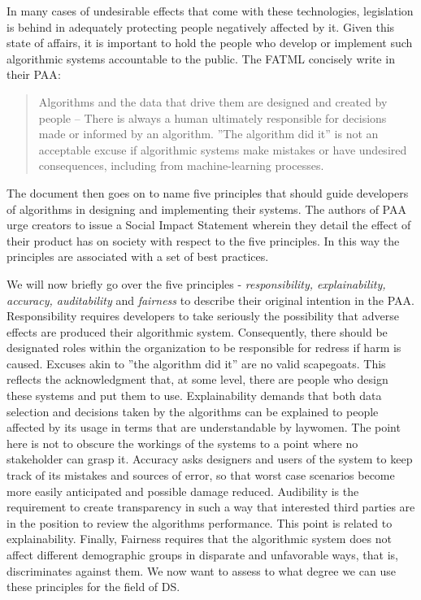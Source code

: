\documentclass{article}
\begin{document}
\newpage In many cases of undesirable effects that come with these technologies, legislation is behind in adequately protecting people negatively affected by it.
Given this state of affairs, it is important to hold the people who develop or implement such algorithmic systems accountable to the public. The FATML concisely write in their PAA\cite{principles}: 
\begin{quote}
Algorithms and the data that drive them are designed and created by people -- There is always a human ultimately responsible for decisions made or informed by an algorithm. ''The algorithm did it'' is not an acceptable excuse if algorithmic systems make mistakes or have undesired consequences, including from machine-learning processes.
\end{quote}

The document then goes on to name five principles that should guide developers of algorithms in designing and implementing their systems. The authors of PAA urge creators to issue a Social Impact Statement wherein they detail the effect of their product has on society with respect to the five principles. In this way the principles are associated with a set of best practices.

We will now briefly go over the five principles - \emph{responsibility, explainability, accuracy, auditability} and \emph{fairness} to describe their original intention in the PAA.
Responsibility requires developers to take seriously the possibility that adverse effects are produced their algorithmic system. Consequently, there should be designated roles within the organization to be responsible for redress if harm is caused. Excuses akin to ''the algorithm did it'' are no valid scapegoats. This reflects the acknowledgment that, at some level, there are people who design these systems and put them to use.
Explainability demands that both data selection and decisions taken by the algorithms can be explained to people affected by its usage in terms that are understandable by laywomen. The point here is not to obscure the workings of the systems to a point where no stakeholder can grasp it.
Accuracy asks designers and users of the system to keep track of its mistakes and sources of error, so that worst case scenarios become more easily anticipated and possible damage reduced.
Audibility is the requirement to create transparency in such a way that interested third parties are in the position to review the algorithms performance. This point is related to explainability.
Finally, Fairness requires that the algorithmic system does not affect different demographic groups in disparate and unfavorable ways, that is, discriminates against them.
We now want to assess to what degree we can use these principles for the field of DS.
\end{document}

